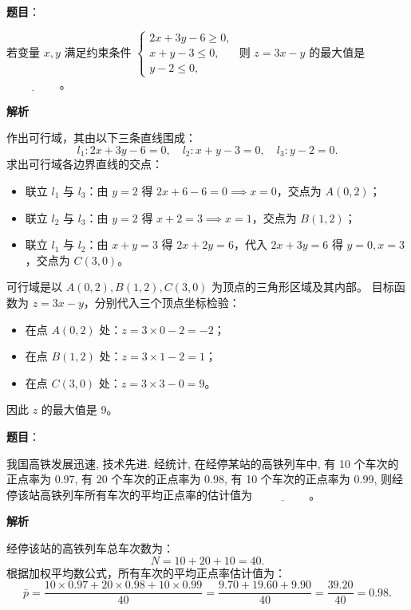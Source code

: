 \begin{answer}

\textbf{题目}：

若变量 $x, y$ 满足约束条件 $\begin{cases} 2x + 3y - 6 \geqslant 0, \\ x + y - 3 \leqslant 0, \\ y - 2 \leqslant 0, \end{cases}$ 则 $z = 3x - y$ 的最大值是 $\underline{\hspace{2cm}}$。

\textbf{解析}

作出可行域，其由以下三条直线围成：
\nopagebreak[4]
\[l_1: 2x + 3y - 6 = 0, \quad l_2: x + y - 3 = 0, \quad l_3: y - 2 = 0.\]
求出可行域各边界直线的交点：
\begin{itemize}
\item 联立 $l_1$ 与 $l_3$：由 $y = 2$ 得 $2x + 6 - 6 = 0 \implies x = 0$，交点为 $A(0, 2)$；
\item 联立 $l_2$ 与 $l_3$：由 $y = 2$ 得 $x + 2 = 3 \implies x = 1$，交点为 $B(1, 2)$；
\item 联立 $l_1$ 与 $l_2$：由 $x + y = 3$ 得 $2x + 2y = 6$，代入 $2x + 3y = 6$ 得 $y = 0, x = 3$，交点为 $C(3, 0)$。
\end{itemize}
可行域是以 $A(0, 2), B(1, 2), C(3, 0)$ 为顶点的三角形区域及其内部。
目标函数为 $z = 3x - y$，分别代入三个顶点坐标检验：
\begin{itemize}
\item 在点 $A(0, 2)$ 处：$z = 3 \times 0 - 2 = -2$；
\item 在点 $B(1, 2)$ 处：$z = 3 \times 1 - 2 = 1$；
\item 在点 $C(3, 0)$ 处：$z = 3 \times 3 - 0 = 9$。
\end{itemize}
因此 $z$ 的最大值是 9。


\end{answer}
\begin{answer}

\textbf{题目}：

我国高铁发展迅速, 技术先进. 经统计, 在经停某站的高铁列车中, 有 10 个车次的正点率为 0.97, 有 20 个车次的正点率为 0.98, 有 10 个车次的正点率为 0.99, 则经停该站高铁列车所有车次的平均正点率的估计值为 $\underline{\hspace{2cm}}$。

\textbf{解析}

经停该站的高铁列车总车次数为：
\nopagebreak[4]
\[N = 10 + 20 + 10 = 40.\]
根据加权平均数公式，所有车次的平均正点率估计值为：
\nopagebreak[4]
\[\bar{p} = \frac{10 \times 0.97 + 20 \times 0.98 + 10 \times 0.99}{40} = \frac{9.70 + 19.60 + 9.90}{40} = \frac{39.20}{40} = 0.98.\]


\end{answer}
